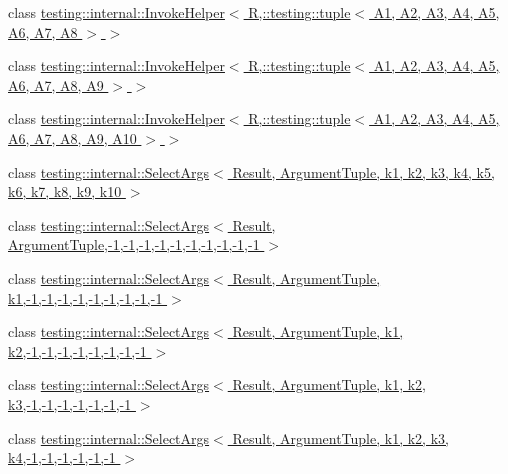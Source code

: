 \begin{DoxyCompactItemize}
class \hyperlink{classtesting_1_1internal_1_1_invoke_helper_3_01_r_00_1_1testing_1_1tuple_3_01_a1_00_01_a2_00_01_e6fe94962f933bc582acd55e0092e60f}{testing\+::internal\+::\+Invoke\+Helper$<$ R,\+::testing\+::tuple$<$ A1, A2, A3, A4, A5, A6, A7, A8 $>$ $>$}
\item 
class \hyperlink{classtesting_1_1internal_1_1_invoke_helper_3_01_r_00_1_1testing_1_1tuple_3_01_a1_00_01_a2_00_01_54a05d3b1a768be53cb8b099dc24ceaa}{testing\+::internal\+::\+Invoke\+Helper$<$ R,\+::testing\+::tuple$<$ A1, A2, A3, A4, A5, A6, A7, A8, A9 $>$ $>$}
\item 
class \hyperlink{classtesting_1_1internal_1_1_invoke_helper_3_01_r_00_1_1testing_1_1tuple_3_01_a1_00_01_a2_00_01_10b1582d97e7947a00193b033e4526b3}{testing\+::internal\+::\+Invoke\+Helper$<$ R,\+::testing\+::tuple$<$ A1, A2, A3, A4, A5, A6, A7, A8, A9, A10 $>$ $>$}
\item 
class \hyperlink{classtesting_1_1internal_1_1_select_args}{testing\+::internal\+::\+Select\+Args$<$ Result, Argument\+Tuple, k1, k2, k3, k4, k5, k6, k7, k8, k9, k10 $>$}
\item 
class \hyperlink{classtesting_1_1internal_1_1_select_args_3_01_result_00_01_argument_tuple_00-1_00-1_00-1_00-1_005f626e5adb9246c46f665dbb755b50f6}{testing\+::internal\+::\+Select\+Args$<$ Result, Argument\+Tuple,-\/1,-\/1,-\/1,-\/1,-\/1,-\/1,-\/1,-\/1,-\/1,-\/1 $>$}
\item 
class \hyperlink{classtesting_1_1internal_1_1_select_args_3_01_result_00_01_argument_tuple_00_01k1_00-1_00-1_00-16ae4dde9341810fff5dd4b06d1d121a8}{testing\+::internal\+::\+Select\+Args$<$ Result, Argument\+Tuple, k1,-\/1,-\/1,-\/1,-\/1,-\/1,-\/1,-\/1,-\/1,-\/1 $>$}
\item 
class \hyperlink{classtesting_1_1internal_1_1_select_args_3_01_result_00_01_argument_tuple_00_01k1_00_01k2_00-1_014202daea627b6852873e503b1bfe3a0}{testing\+::internal\+::\+Select\+Args$<$ Result, Argument\+Tuple, k1, k2,-\/1,-\/1,-\/1,-\/1,-\/1,-\/1,-\/1,-\/1 $>$}
\item 
class \hyperlink{classtesting_1_1internal_1_1_select_args_3_01_result_00_01_argument_tuple_00_01k1_00_01k2_00_01k662b7b95311371409ab0c0d22a638b79}{testing\+::internal\+::\+Select\+Args$<$ Result, Argument\+Tuple, k1, k2, k3,-\/1,-\/1,-\/1,-\/1,-\/1,-\/1,-\/1 $>$}
\item 
class \hyperlink{classtesting_1_1internal_1_1_select_args_3_01_result_00_01_argument_tuple_00_01k1_00_01k2_00_01k69e12b55446b1a17c0daec13dac1d86f}{testing\+::internal\+::\+Select\+Args$<$ Result, Argument\+Tuple, k1, k2, k3, k4,-\/1,-\/1,-\/1,-\/1,-\/1,-\/1 $>$}

\end{DoxyCompactItemize}
